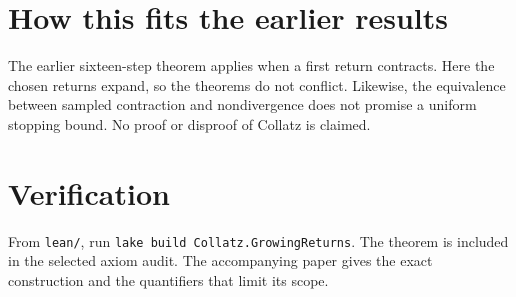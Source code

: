 \documentclass[10pt]{article}
\begin{document}
\section*{How this fits the earlier results}
The earlier sixteen-step theorem applies when a first return contracts.
Here the chosen returns expand, so the theorems do not conflict. Likewise,
the equivalence between sampled contraction and nondivergence does not
promise a uniform stopping bound. No proof or disproof of Collatz is claimed.

\section*{Verification}
From \texttt{lean/}, run \texttt{lake build Collatz.GrowingReturns}.
The theorem is included in the selected axiom audit. The accompanying
paper gives the exact construction and the quantifiers that limit its scope.
\end{document}
